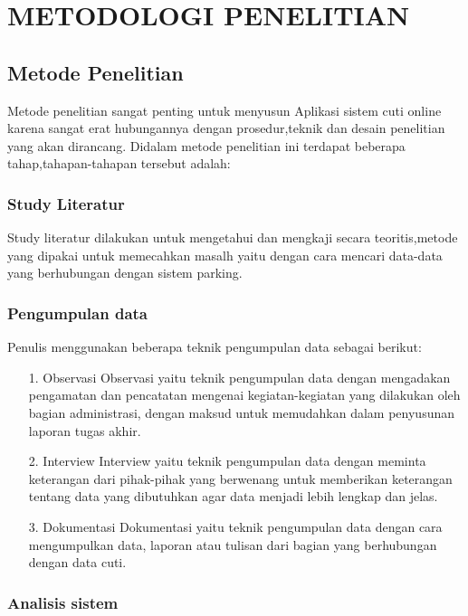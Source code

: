 \documentclass{jtetiproposalskripsi}
\begin{document}
\chapter{METODOLOGI PENELITIAN}

\section{Metode Penelitian}
Metode penelitian sangat penting untuk menyusun Aplikasi sistem cuti online karena sangat erat hubungannya dengan prosedur,teknik dan desain penelitian yang akan dirancang. Didalam metode penelitian ini terdapat beberapa tahap,tahapan-tahapan tersebut adalah:
\subsection{Study Literatur}
Study literatur dilakukan untuk mengetahui dan mengkaji secara teoritis,metode yang dipakai untuk memecahkan masalh yaitu dengan cara mencari data-data yang berhubungan dengan sistem parking.
\subsection{Pengumpulan data}
Penulis menggunakan beberapa teknik pengumpulan data sebagai berikut:
\begin{itemize}
\item[1.]Observasi
Observasi yaitu teknik pengumpulan data dengan mengadakan pengamatan
dan pencatatan mengenai kegiatan-kegiatan yang dilakukan oleh bagian
administrasi, dengan maksud untuk memudahkan dalam penyusunan  laporan tugas akhir.
\item[2.]Interview
Interview yaitu teknik pengumpulan data dengan meminta keterangan dari
pihak-pihak yang berwenang untuk memberikan keterangan tentang data yang
dibutuhkan agar data menjadi lebih lengkap dan jelas.
\item[3.]Dokumentasi
Dokumentasi yaitu teknik pengumpulan data dengan cara mengumpulkan
data, laporan atau tulisan dari bagian yang berhubungan dengan data cuti.
\end{itemize}

\subsection{Analisis sistem} 
\end{document}
